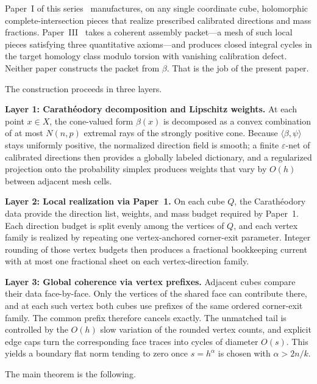 \documentclass[11pt]{article}
\numberwithin{equation}{section}
\theoremstyle{plain}
\theoremstyle{definition}
\theoremstyle{remark}
\newcommand{\eps}{\varepsilon}
\begin{document}
Paper~I of this series~\cite[Thm.~1.1]{Washburn26I} manufactures, on any single coordinate cube, holomorphic complete-intersection pieces that realize prescribed calibrated directions and mass fractions.  Paper~III~\cite[Thm.~1.1]{Washburn26III} takes a coherent assembly packet---a mesh of such local pieces satisfying three quantitative axioms---and produces closed integral cycles in the target homology class modulo torsion with vanishing calibration defect.  Neither paper constructs the packet from $\beta$.  That is the job of the present paper.

The construction proceeds in three layers.

\smallskip\noindent
\textbf{Layer 1: Carath\'eodory decomposition and Lipschitz weights.}
At each point $x\in X$, the cone-valued form $\beta(x)$ is decomposed as a convex combination of at most $N(n,p)$ extremal rays of the strongly positive cone.  Because $\langle\beta,\psi\rangle$ stays uniformly positive, the normalized direction field is smooth; a finite $\eps$-net of calibrated directions then provides a globally labeled dictionary, and a regularized projection onto the probability simplex produces weights that vary by $O(h)$ between adjacent mesh cells.

\smallskip\noindent
\textbf{Layer 2: Local realization via Paper~1.}
On each cube $Q$, the Carath\'eodory data provide the direction list, weights, and mass budget required by Paper~1.  Each direction budget is split evenly among the vertices of $Q$, and each vertex family is realized by repeating one vertex-anchored corner-exit parameter.  Integer rounding of those vertex budgets then produces a fractional bookkeeping current with at most one fractional sheet on each vertex-direction family.

\smallskip\noindent
\textbf{Layer 3: Global coherence via vertex prefixes.}
Adjacent cubes compare their data face-by-face.  Only the vertices of the shared face can contribute there, and at each such vertex both cubes use prefixes of the same ordered corner-exit family.  The common prefix therefore cancels exactly.  The unmatched tail is controlled by the $O(h)$ slow variation of the rounded vertex counts, and explicit edge caps turn the corresponding face traces into cycles of diameter $O(s)$.  This yields a boundary flat norm tending to zero once $s=h^\alpha$ is chosen with $\alpha>2n/k$.

\medskip

The main theorem is the following.

\medskip
\end{document}
